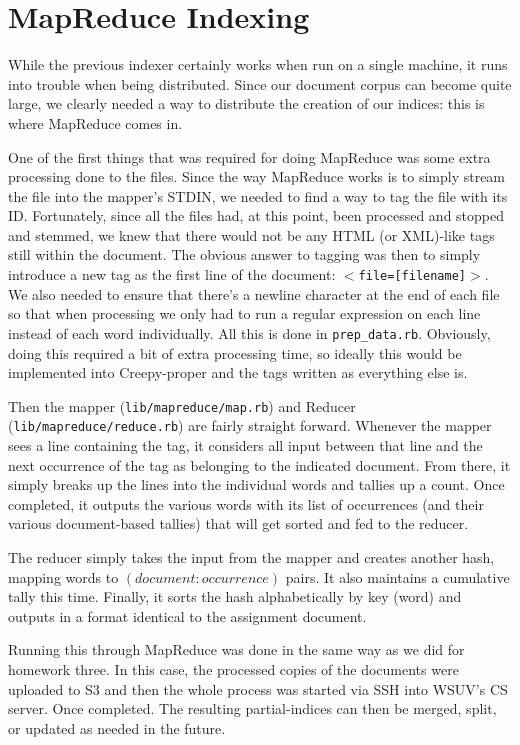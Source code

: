 \documentclass[letterpaper,11pt,twoside]{article}
\begin{document}
\section{MapReduce Indexing}
While the previous indexer certainly works when run on a single machine, it runs into trouble when being distributed. Since our document corpus can become quite large, we clearly needed a way to distribute the creation of our indices: this is where MapReduce comes in.

One of the first things that was required for doing MapReduce was some extra processing done to the files. Since the way MapReduce works is to simply stream the file into the mapper's STDIN, we needed to find a way to tag the file with its ID. Fortunately, since all the files had, at this point, been processed and stopped and stemmed, we knew that there would not be any HTML (or XML)-like tags still within the document. The obvious answer to tagging was then to simply introduce a new tag as the first line of the document: \texttt{$<$file=[filename]$>$}. We also needed to ensure that there's a newline character at the end of each file so that when processing we only had to run a regular expression on each line instead of each word individually. All this is done in \texttt{prep\_data.rb}. Obviously, doing this required a bit of extra processing time, so ideally this would be implemented into Creepy-proper and the tags written as everything else is.

Then the mapper (\texttt{lib/mapreduce/map.rb}) and Reducer (\texttt{lib/mapreduce/reduce.rb}) are fairly straight forward. Whenever the mapper sees a line containing the tag, it considers all input between that line and the next occurrence of the tag as belonging to the indicated document. From there, it simply breaks up the lines into the individual words and tallies up a count. Once completed, it outputs the various words with its list of occurrences (and their various document-based tallies) that will get sorted and fed to the reducer.

The reducer simply takes the input from the mapper and creates another hash, mapping words to $(document:occurrence)$ pairs. It also maintains a cumulative tally this time. Finally, it sorts the hash alphabetically by key (word) and outputs in a format identical to the assignment document.

Running this through MapReduce was done in the same way as we did for homework three. In this case, the processed copies of the documents were uploaded to S3 and then the whole process was started via SSH into WSUV's CS server. Once completed. The resulting partial-indices can then be merged, split, or updated as needed in the future.
\end{document}

